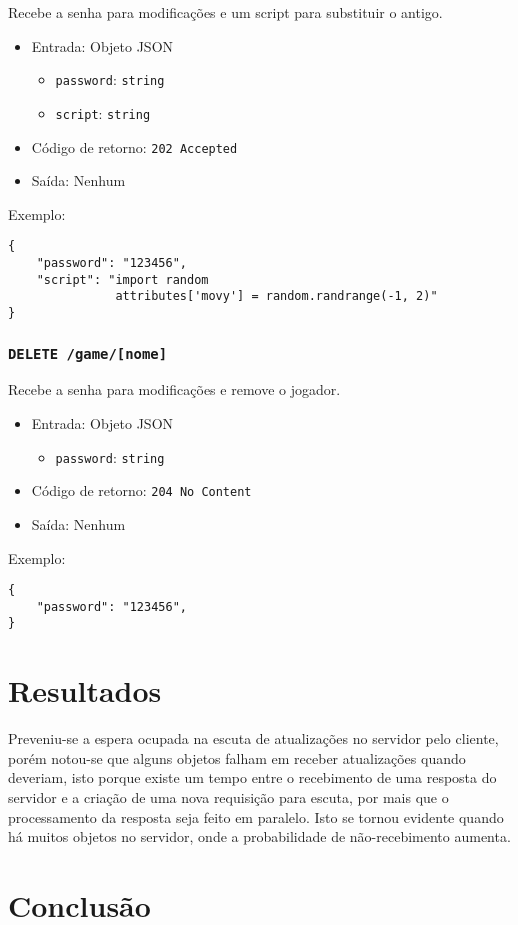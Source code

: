 \documentclass[12pt,a4paper]{article}
\begin{document}
Recebe a senha para modificações e um script para substituir o antigo.

\begin{itemize}
	\item Entrada: Objeto JSON
		\begin{itemize}
			\item \texttt{password}: \texttt{string}
			\item \texttt{script}: \texttt{string}
		\end{itemize}
	\item Código de retorno: \texttt{202 Accepted}
	\item Saída: Nenhum
\end{itemize}

Exemplo:

\begin{verbatim}
{
    "password": "123456",
    "script": "import random
               attributes['movy'] = random.randrange(-1, 2)"
}
\end{verbatim}

\subsubsection{\texttt{DELETE /game/[nome]}}

Recebe a senha para modificações e remove o jogador.

\begin{itemize}
	\item Entrada: Objeto JSON
		\begin{itemize}
			\item \texttt{password}: \texttt{string}
		\end{itemize}
	\item Código de retorno: \texttt{204 No Content}
	\item Saída: Nenhum
\end{itemize}

Exemplo:

\begin{verbatim}
{
    "password": "123456",
}
\end{verbatim}

\pagebreak \section{Resultados}

Preveniu-se a espera ocupada na escuta de atualizações no servidor pelo
cliente, porém notou-se que alguns objetos falham em receber atualizações
quando deveriam, isto porque existe um tempo entre o recebimento de uma
resposta do servidor e a criação de uma nova requisição para escuta, por mais
que o processamento da resposta seja feito em paralelo. Isto se tornou evidente
quando há muitos objetos no servidor, onde a probabilidade de não-recebimento
aumenta.

\pagebreak \section{Conclusão}

%
%
\end{document}
